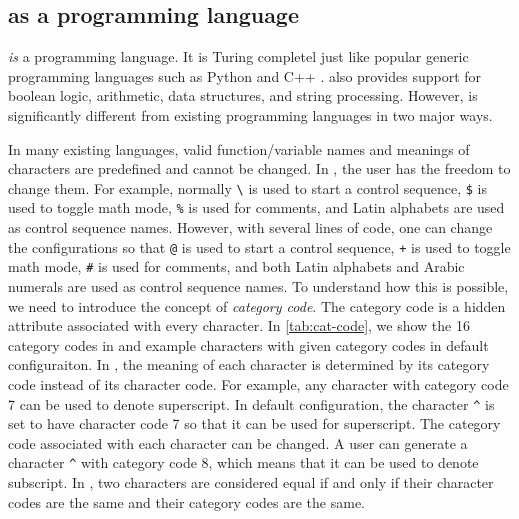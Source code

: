 \documentclass{ltugboat}
\begin{document}
\subsection{\LT{} as a programming language}

\LT{} \emph{is} a programming language. 
It is Turing completel just like popular generic programming languages such as Python \cite{vanrossum2010python} and C++ \cite{stroustrup2013cpp}. 
\LT{} also provides support for boolean logic, arithmetic, data structures, and string processing.
However, \LT{} is significantly different from existing programming languages in two major ways.

In many existing languages, valid function/variable names and meanings of characters are predefined and cannot be changed.
In \LT{}, the user has the freedom to change them.
For example, normally \verb|\| is used to start a control sequence, \verb|$| is used to toggle math mode, \verb|%| is used for comments, and Latin alphabets are used as control sequence names.
However, with several lines of code, one can change the configurations so that \verb|@| is used to start a control sequence, \verb|+| is used to toggle math mode, \verb|#| is used for comments, and both Latin alphabets and Arabic numerals are used as control sequence names.
To understand how this is possible, we need to introduce the concept of \emph{category code}.
The category code is a hidden attribute associated with every character.
In \cref{tab:cat-code}, we show the 16 category codes in \LT{} and example characters with given category codes in default \LT{} configuraiton.
In \LT{}, the meaning of each character is determined by its category code instead of its character code. 
For example, any character with category code 7 can be used to denote superscript.
In default \LT{} configuration, the character \verb|^| is set to have character code 7 so that it can be used for superscript.
The category code associated with each character can be changed. 
A user can generate a character \verb|^| with category code 8, which means that it can be used to denote subscript.
In \LT{}, two characters are considered equal if and only if their character codes are the same and their category codes are the same.
\end{document}
